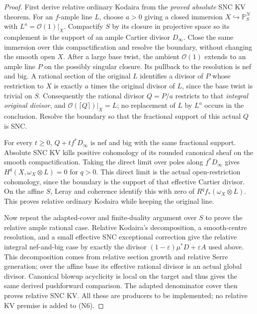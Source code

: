 \begin{proof}
First derive relative ordinary Kodaira from the \emph{proved absolute}
SNC KV theorem.  For an $f$-ample line $L$, choose $a>0$ giving a
closed immersion $X\hookrightarrow\mathbb P^N_S$ with
$L^a=\mathcal O(1)|_X$.  Compactify $S$ by its closure in projective
space so its complement is the support of an ample Cartier divisor
$D_\infty$.  Close the same immersion over this compactification
and resolve the boundary, without changing the smooth open $X$.
After a large base twist, the ambient $\mathcal O(1)$ extends to an
ample line $P$ on the possibly singular closure.  Its pullback to
the resolution is nef and big.  A rational section of the original
$L$ identifies a divisor of $P$ whose restriction to $X$ is exactly
$a$ times the original divisor of $L$, since the base twist is
trivial on $S$.  Consequently the rational divisor $Q=P/a$ restricts
to that \emph{integral original divisor}, and
$\mathcal O(\lceil Q\rceil)|_X=L$; no replacement of $L$ by $L^a$
occurs in the conclusion.  Resolve the boundary so that the
fractional support of this actual $Q$ is SNC.

For every $t\geq0$, $Q+t f^*D_\infty$ is nef and big with the same
fractional support.  Absolute SNC KV kills positive cohomology of
its rounded canonical sheaf on the smooth compactification.
Taking the direct limit over poles along $f^*D_\infty$ gives
$H^q(X,\omega_X\otimes L)=0$ for $q>0$.  This direct limit is the
actual open-restriction cohomology, since the boundary is the
support of that effective Cartier divisor.  On the affine $S$,
Leray and coherence identify this with zero of
$R^q f_*(\omega_X\otimes L)$.  This proves relative ordinary
Kodaira while keeping the original line.

Now repeat the adapted-cover and finite-duality argument over $S$
to prove the relative ample rational case.  Relative Kodaira's
decomposition, a smooth-centre resolution, and a small effective
SNC exceptional correction give the relative integral nef-and-big
case by exactly the divisor
$(1-\varepsilon)\mu^*D+\varepsilon A$ used above.  This decomposition
comes from relative section growth and relative Serre generation;
over the affine base its effective rational divisor is an actual
global divisor.  Canonical blowup acyclicity is local on the target
and thus gives the same derived pushforward comparison.  The
adapted denominator cover then proves relative SNC KV.  All these
are producers to be implemented; no relative KV premise is added
to (N6).


\end{proof}
